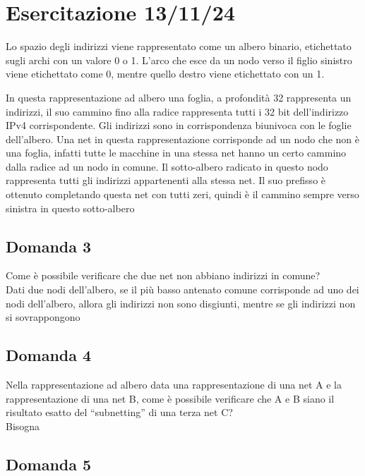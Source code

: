 \documentclass{article}
\numberwithin{equation}{subsection}
\begin{document}
\clearpage

\section{Esercitazione 13/11/24}

Lo spazio degli indirizzi viene rappresentato come un albero binario, etichettato sugli archi con un valore 0 o 1. L'arco che esce da un nodo verso 
il figlio sinistro viene etichettato come 0, mentre quello destro viene etichettato con un 1. 

In questa rappresentazione ad albero una foglia, a profondità 32 rappresenta un indirizzi, il suo cammino fino alla radice rappresenta tutti i 32 bit dell'indirizzo 
IPv4 corrispondente. 
Gli indirizzi sono in corrispondenza biunivoca con le foglie dell'albero. Una net in questa rappresentazione corrisponde ad un nodo che non è una foglia, 
infatti tutte le macchine in una stessa net hanno un certo cammino dalla radice ad un nodo in comune. Il sotto-albero radicato in questo nodo rappresenta tutti gli 
indirizzi appartenenti alla stessa net. 
Il suo prefisso è ottenuto completando questa net con tutti zeri, quindi è il cammino sempre verso sinistra in questo sotto-albero


\subsection*{Domanda 3}

Come è possibile verificare che due net non abbiano indirizzi in comune?\\
Dati due nodi dell'albero, se il più basso antenato comune corrisponde ad uno dei nodi dell'albero, allora gli indirizzi non sono disgiunti, 
mentre se gli indirizzi non si sovrappongono %

\subsection*{Domanda 4}

Nella rappresentazione ad albero data una rappresentazione di una net A e la rappresentazione di una net B, come è possibile verificare che A e B siano il risultato 
esatto del ``subnetting'' di una terza net C?\\
Bisogna 

\subsection*{Domanda 5}
\end{document}
